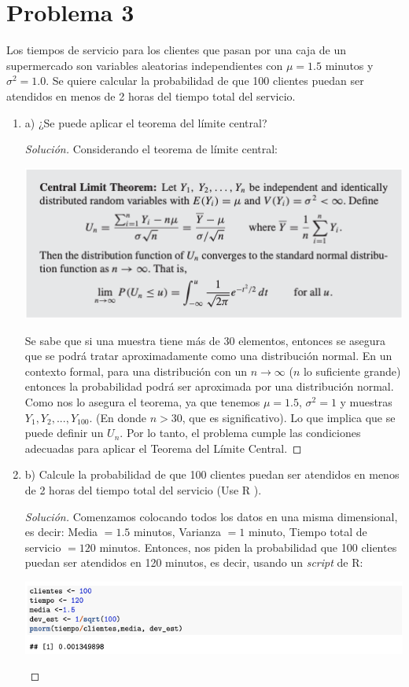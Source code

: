 \documentclass[a4paper,12pt]{article}
\newenvironment{solution}
  {\renewcommand\qedsymbol{$\blacksquare$}\begin{proof}[Solución]}
  {\end{proof}}
\begin{document}
\section{Problema 3}
 Los tiempos de servicio para los clientes que pasan por una caja de un supermercado son variables aleatorias independientes con $\mu=1.5$ minutos y $\sigma^{2}=1.0$. Se quiere calcular la probabilidad de que 100 clientes puedan ser atendidos en menos de 2 horas del tiempo total del servicio.
 \begin{enumerate}
 \item a) ¿Se puede aplicar el teorema del límite central?
\begin{solution}
Considerando el teorema de límite central: 
\begin{center}
    \includegraphics[scale=0.7]{images/TeoLimiteCentral.png}
\end{center}
Se sabe que si una muestra tiene más de 30 elementos, entonces se asegura que se podrá tratar aproximadamente como una distribución normal. En un contexto formal, para una distribución con un $n\to \infty$ ($n$ lo suficiente grande) entonces la probabilidad podrá ser aproximada por una distribución normal.
\newline\newline
Como nos lo asegura el teorema, ya que tenemos $\mu=1.5$, $\sigma^2=1$ y muestras $Y_1,Y_2,...,Y_{100}$. (En donde $n> 30$, que es significativo). Lo que implica que se puede definir un $U_n$. Por lo tanto, el problema cumple las condiciones adecuadas para aplicar el Teorema del Límite Central.
\end{solution}

 \item b) Calcule la probabilidad de que 100 clientes puedan ser atendidos en menos de 2 horas del tiempo total del servicio (Use $\mathrm{R}$ ).
 \begin{solution}
 Comenzamos colocando todos los datos en una misma dimensional, es decir: Media $=1.5$ minutos,  Varianza $=1$ minuto, Tiempo total de servicio $= 120$ minutos. Entonces, nos piden la probabilidad que 100 clientes puedan ser atendidos en 120 minutos, es decir, usando un \textit{script} de R: 
 \begin{center}
     \includegraphics[scale=0.5]{images/r.png}
 \end{center}
 

\end{solution}
\end{enumerate}
\end{document}
